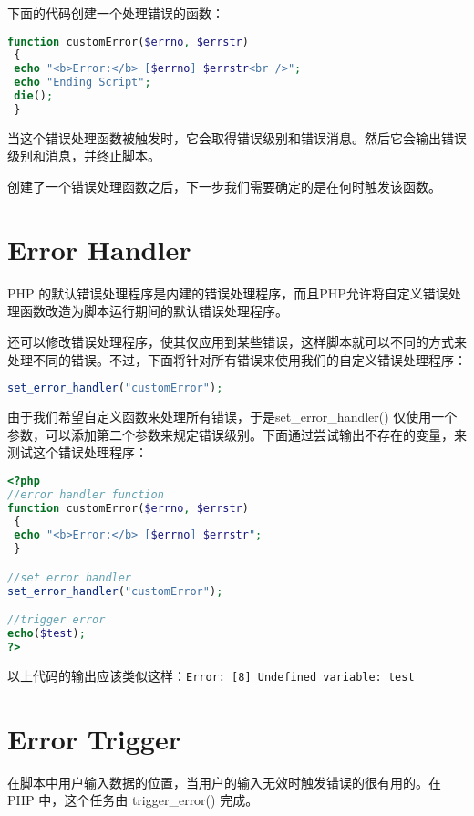 下面的代码创建一个处理错误的函数：

\begin{lstlisting}[language=PHP]
function customError($errno, $errstr)
 { 
 echo "<b>Error:</b> [$errno] $errstr<br />";
 echo "Ending Script";
 die();
 }
\end{lstlisting}


当这个错误处理函数被触发时，它会取得错误级别和错误消息。然后它会输出错误级别和消息，并终止脚本。


创建了一个错误处理函数之后，下一步我们需要确定的是在何时触发该函数。



\section{Error Handler}
\label{error_handler}


PHP 的默认错误处理程序是内建的错误处理程序，而且PHP允许将自定义错误处理函数改造为脚本运行期间的默认错误处理程序。


还可以修改错误处理程序，使其仅应用到某些错误，这样脚本就可以不同的方式来处理不同的错误。不过，下面将针对所有错误来使用我们的自定义错误处理程序：


\begin{lstlisting}[language=PHP]
set_error_handler("customError");
\end{lstlisting}

由于我们希望自定义函数来处理所有错误，于是set\_error\_handler() 仅使用一个参数，可以添加第二个参数来规定错误级别。下面通过尝试输出不存在的变量，来测试这个错误处理程序：

\begin{lstlisting}[language=PHP]
<?php
//error handler function
function customError($errno, $errstr)
 { 
 echo "<b>Error:</b> [$errno] $errstr";
 }

//set error handler
set_error_handler("customError");

//trigger error
echo($test);
?>
\end{lstlisting}

以上代码的输出应该类似这样：\verb|Error: [8] Undefined variable: test|


\section{Error Trigger}


在脚本中用户输入数据的位置，当用户的输入无效时触发错误的很有用的。在 PHP 中，这个任务由 trigger\_error() 完成。


